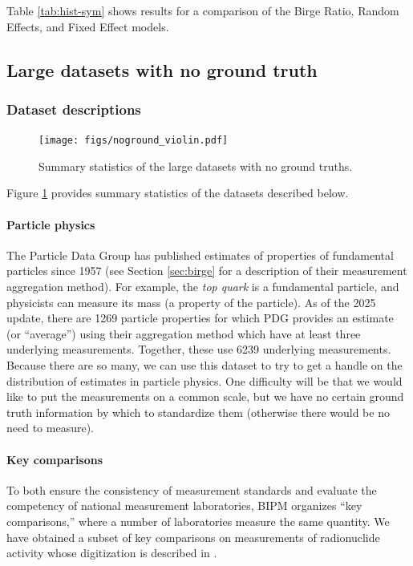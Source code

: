 \documentclass[12pt]{article}
\begin{document}
Table \ref{tab:hist-sym} shows results for a comparison of the Birge Ratio, Random Effects, and Fixed Effect models.

\subsection{Large datasets with no ground truth}\label{fundamental-particles}

\subsubsection{Dataset descriptions}

\begin{figure}
  \centering
  \texttt{[image: figs/noground\_violin.pdf]}
  \caption{Summary statistics of the large datasets with no ground truths.}\label{fig:noground-violin}
\end{figure}

Figure \ref{fig:noground-violin} provides summary statistics of the datasets described below.

\paragraph{Particle physics} The Particle Data Group has published estimates of properties of fundamental particles since 1957 (see Section \ref{sec:birge} for a description of their measurement aggregation method). For example, the \emph{top quark} is a fundamental particle, and physicists can measure its mass (a property of the particle). As of the 2025 update, there are 1269 particle properties for which PDG provides an estimate (or ``average'') using their aggregation method which have at least three underlying measurements. Together, these use 6239 underlying measurements. Because there are so many, we can use this dataset to try to get a handle on the distribution of estimates in particle physics. One difficulty will be that we would like to put the measurements on a common scale, but we have no certain ground truth information by which to standardize them (otherwise there would be no need to measure).

\paragraph{Key comparisons} To both ensure the consistency of measurement standards and evaluate the competency of national measurement laboratories, BIPM organizes ``key comparisons,'' where a number of laboratories measure the same quantity. We have obtained a subset of key comparisons on measurements of radionuclide activity whose digitization is described in \cite{coulon2021digitalization}.
\end{document}
